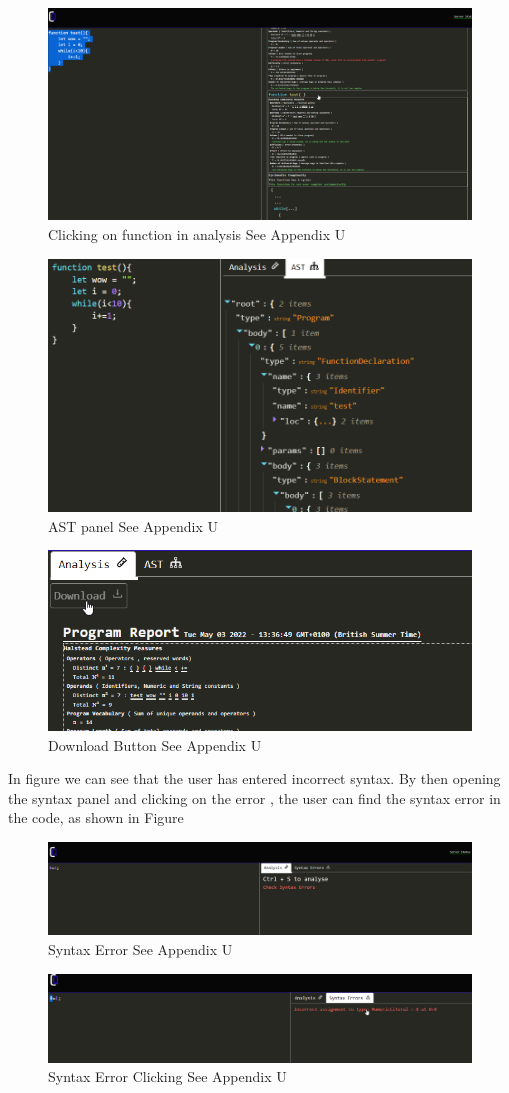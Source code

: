 \begin{figure}[h]
    \includegraphics[width=.5\textwidth]{images/clickfunc.png}
    \caption{Clicking on function in analysis See Appendix U}
    \label{fig:clickfunc}
\end{figure}
\begin{figure}[h]
    \includegraphics[width=.5\textwidth]{images/ast.png}
    \caption{AST panel See Appendix U}
    \label{fig:astpanel}
\end{figure}
\begin{figure}[h]
    \includegraphics[width=.4\textwidth]{images/downloadbutton.png}
    \caption{Download Button See Appendix U}
    \label{fig:downloadbutton}
\end{figure}

In figure  we can see that the user has entered incorrect syntax. By then opening the syntax panel and clicking on the error , 
the user can find the syntax error in the code, as shown in Figure 
\begin{figure}[h]
    \includegraphics[width=.5\textwidth]{images/syntax1.png}
    \caption{Syntax Error See Appendix U}
    \label{fig:syntax1}
\end{figure}
\begin{figure}[h]
    \includegraphics[width=.5\textwidth]{images/syntax2.png}
    \caption{Syntax Error Clicking See Appendix U}
    \label{fig:syntax2}
\end{figure}
\newpage